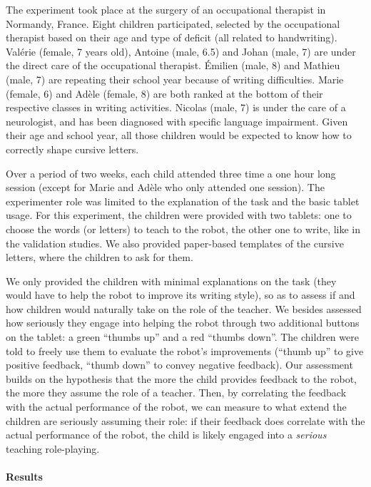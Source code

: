 \documentclass{article}
\begin{document}
The experiment took place at the surgery of an occupational therapist in
Normandy, France. Eight children participated, selected by the occupational
therapist based on their age and type of deficit (all related to handwriting).
Valérie (female, 7 years old), Antoine (male, 6.5) and Johan (male, 7) are under
the direct care of the occupational therapist. Émilien (male, 8) and Mathieu
(male, 7) are repeating their school year because of writing difficulties. Marie
(female, 6) and Adèle (female, 8) are both ranked at the bottom of their
respective classes in writing activities. Nicolas (male, 7) is under the care of
a neurologist, and has been diagnosed with specific language impairment. Given
their age and school year, all those children would be expected to know how to
correctly shape cursive letters. 

Over a period of two weeks, each child attended three time a one hour long
session (except for Marie and Adèle who only attended one session). The
experimenter role was limited to the explanation of the task and the basic
tablet usage. For this experiment, the children were provided with two tablets:
one to choose the words (or letters) to teach to the robot, the other one to
write, like in the validation studies. We also provided paper-based templates of
the cursive letters, where the children to ask for them.

We only provided the children with minimal explanations on the task (they would
have to help the robot to improve its writing style), so as to assess if and how
children would naturally take on the role of the teacher. We besides assessed
how seriously they engage into helping the robot through two additional buttons
on the tablet: a green ``thumbs up'' and a red ``thumbs down''. The children
were told to freely use them to evaluate the robot's improvements (``thumb up''
to give positive feedback, ``thumb down'' to convey negative feedback). Our
assessment builds on the hypothesis that the more the child provides feedback to
the robot, the more they assume the role of a teacher. Then, by correlating the
feedback with the actual performance of the robot, we can measure to what extend
the children are seriously assuming their role: if their feedback does correlate
with the actual performance of the robot, the child is likely engaged into a
\emph{serious} teaching role-playing.


\paragraph{Results}
\end{document}
